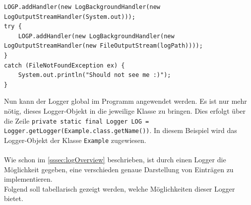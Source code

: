 \begin{lstlisting}[style=java,caption=Logger Implementierung,label=loggerOutput]
LOGP.addHandler(new LogBackgroundHandler(new LogOutputStreamHandler(System.out)));
try {
    LOGP.addHandler(new LogBackgroundHandler(new LogOutputStreamHandler(new FileOutputStream(logPath))));
}
catch (FileNotFoundException ex) {
    System.out.println("Should not see me :)");
}
\end{lstlisting}
Nun kann der Logger global im Programm angewendet werden.
Es ist nur mehr nötig, dieses Logger-Objekt in die jeweilige Klasse zu bringen.
Dies erfolgt über die Zeile \lstinline[style=java]{private static final Logger LOG = Logger.getLogger(Example.class.getName())}.
In diesem Beispiel wird das Logger-Objekt der Klasse \lstinline[style=java]{Example} zugewiesen.\\\\
Wie schon im \autoref{sssec:logOverview} beschrieben, ist durch einen Logger die Möglichkeit gegeben, eine verschieden genaue Darstellung von Einträgen zu implementieren.\\
Folgend soll tabellarisch gezeigt werden, welche Möglichkeiten dieser Logger bietet.
